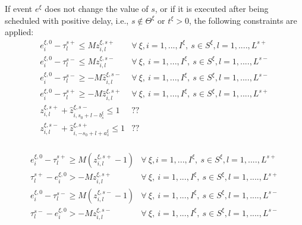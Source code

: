\documentclass[]{interact}
\theoremstyle{plain}%
\theoremstyle{definition}
\theoremstyle{remark}
\begin{document}
If event $e^{\xi}$ does not change the value of $s$, or if it is executed after being scheduled with positive delay, i.e., $s\notin \Theta^{\xi}$ or $t^{\xi}>0$, the following constraints are applied:
\begin{eqnarray}
e^{\xi,0}_{i} - \tau_{l}^{s+} \le Mz^{\xi,s+}_{i,l} & \forall\ \xi,i=1,...,I^{\xi},\ s\in S^{\xi}, l=1,....,L^{s+}\\
e^{\xi,0}_{i} - \tau_{l}^{s-} \le Mz^{\xi,s-}_{i,l} & \forall\ \xi,\ i=1,...,I^{\xi},\ s\in S^{\xi}, l=1,....,L^{s-}\\
e^{\xi,0}_{i} - \tau_{l}^{s-} \ge -M\hat{z}^{\xi,s-}_{i,l}& \forall\ \xi,\ i=1,...,I^{\xi},\ s\in S^{\xi}, l=1,....,L^{s-}\\
e^{\xi,0}_{i} - \tau_{l}^{s+} \ge -M\hat{z}^{\xi,s+}_{i,l}& \forall\ \xi,\ i=1,...,I^{\xi},\ s\in S^{\xi}, l=1,....,L^{s+}\\
z^{\xi,s+}_{i,l}+\hat{z}^{\xi,s-}_{i,s_0+l-b^{\xi}_{s}}\le 1&??\\
z^{\xi,s-}_{i,l}+\hat{z}^{\xi,s+}_{i,-s_0+l+a^{\xi}_{s}}\le 1&??\\
\end{eqnarray}

\begin{eqnarray}
e^{\xi,0}_{i} - \tau_{l}^{s+} \ge M(z^{\xi,s+}_{i,l}-1) & \forall\ \xi,i=1,...,I^{\xi},\ s\in S^{\xi}, l=1,....,L^{s+}\\
\tau_{l}^{s+} - e^{\xi,0}_{i} > -Mz^{\xi,s+}_{i,l}& \forall\ \xi,\ i=1,...,I^{\xi},\ s\in S^{\xi}, l=1,....,L^{s+}\\
e^{\xi,0}_{i} - \tau_{l}^{s-} \ge M(z^{\xi,s-}_{i,l}-1) & \forall\ \xi,\ i=1,...,I^{\xi},\ s\in S^{\xi}, l=1,....,L^{s-}\\
\tau_{l}^{s-} - e^{\xi,0}_{i} > -Mz^{\xi,s-}_{i,l}& \forall\ \xi,\ i=1,...,I^{\xi},\ s\in S^{\xi}, l=1,....,L^{s-}\\
\end{eqnarray}
\end{document}
